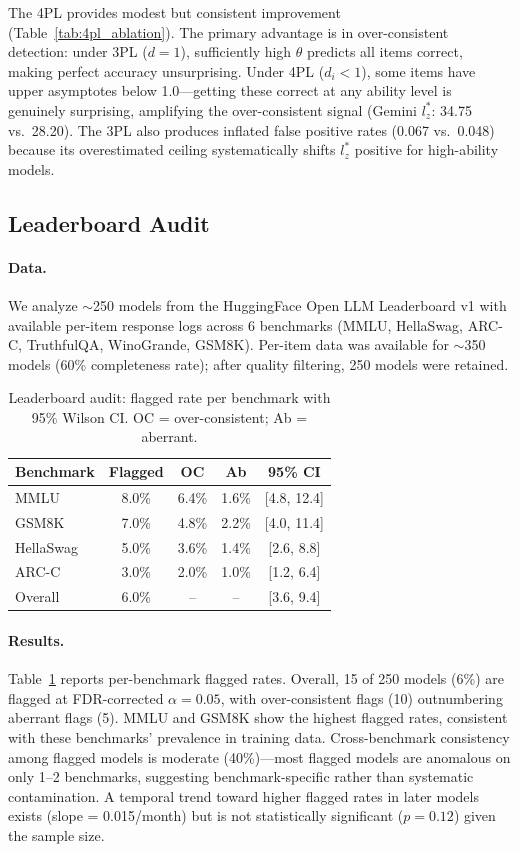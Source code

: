 \documentclass[11pt,a4paper]{article}
\begin{document}
The 4PL provides modest but consistent improvement (Table~\ref{tab:4pl_ablation}). The primary advantage is in over-consistent detection: under 3PL ($d=1$), sufficiently high $\theta$ predicts all items correct, making perfect accuracy unsurprising. Under 4PL ($d_i < 1$), some items have upper asymptotes below 1.0---getting these correct at any ability level is genuinely surprising, amplifying the over-consistent signal (Gemini $l_z^*$: 34.75 vs.\ 28.20). The 3PL also produces inflated false positive rates (0.067 vs.\ 0.048) because its overestimated ceiling systematically shifts $l_z^*$ positive for high-ability models.

\subsection{Leaderboard Audit}
\label{sec:leaderboard}

\paragraph{Data.} We analyze ${\sim}$250 models from the HuggingFace Open LLM Leaderboard v1 with available per-item response logs across 6 benchmarks (MMLU, HellaSwag, ARC-C, TruthfulQA, WinoGrande, GSM8K). Per-item data was available for ${\sim}$350 models (60\% completeness rate); after quality filtering, 250 models were retained.

\begin{table}[t]
\centering
\caption{Leaderboard audit: flagged rate per benchmark with 95\% Wilson CI. OC = over-consistent; Ab = aberrant.}
\label{tab:leaderboard}
\small
\begin{tabular}{l c c c c}
\toprule
Benchmark & Flagged & OC & Ab & 95\% CI \\
\midrule
MMLU & 8.0\% & 6.4\% & 1.6\% & [4.8, 12.4] \\
GSM8K & 7.0\% & 4.8\% & 2.2\% & [4.0, 11.4] \\
HellaSwag & 5.0\% & 3.6\% & 1.4\% & [2.6, 8.8] \\
ARC-C & 3.0\% & 2.0\% & 1.0\% & [1.2, 6.4] \\
\midrule
Overall & 6.0\% & -- & -- & [3.6, 9.4] \\
\bottomrule
\end{tabular}
\end{table}

\paragraph{Results.} Table~\ref{tab:leaderboard} reports per-benchmark flagged rates. Overall, 15 of 250 models (6\%) are flagged at FDR-corrected $\alpha=0.05$, with over-consistent flags (10) outnumbering aberrant flags (5). MMLU and GSM8K show the highest flagged rates, consistent with these benchmarks' prevalence in training data. Cross-benchmark consistency among flagged models is moderate (40\%)---most flagged models are anomalous on only 1--2 benchmarks, suggesting benchmark-specific rather than systematic contamination. A temporal trend toward higher flagged rates in later models exists (slope = 0.015/month) but is not statistically significant ($p=0.12$) given the sample size.
\end{document}
